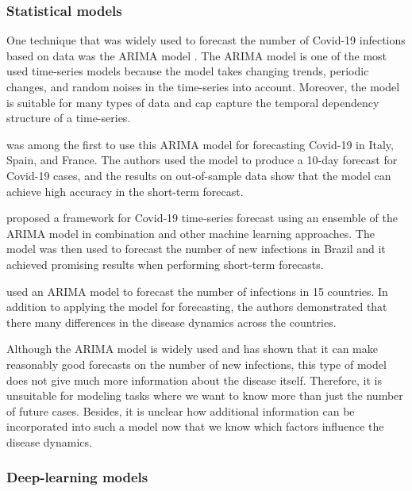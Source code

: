 \subsubsection{Statistical models}

One technique that was widely used to forecast the number of Covid-19 infections based on data was the \gls{ARIMA} model \cite{box2015time}.
The \gls{ARIMA} model is one of the most used time-series models because the model takes changing trends, periodic changes, and random noises in the time-series into account.
Moreover, the model is suitable for many types of data and cap capture the temporal dependency structure of a time-series.

\citeauthor{ceylanEstimationCOVID19Prevalence2020} \cite{ceylanEstimationCOVID19Prevalence2020} was among the first to use this \gls{ARIMA} model for forecasting Covid-19 in Italy, Spain, and France.
The authors used the model to produce a 10-day forecast for Covid-19 cases, and the results on out-of-sample data show that the model can achieve high accuracy in the short-term forecast.

\citeauthor{ribeiroShorttermForecastingCOVID192020} \cite{ribeiroShorttermForecastingCOVID192020} proposed a framework for Covid-19 time-series forecast using an ensemble of the \gls{ARIMA} model in combination and other machine learning approaches.
The model was then used to forecast the number of new infections in Brazil and it achieved promising results when performing short-term forecasts.

\citeauthor{singhPredictionCOVID19Pandemic2020} \cite{singhPredictionCOVID19Pandemic2020} used an \gls{ARIMA} model to forecast the number of infections in 15 countries.
In addition to applying the model for forecasting, the authors demonstrated that there many differences in the disease dynamics across the countries.

Although the \gls{ARIMA} model is widely used and has shown that it can make reasonably good forecasts on the number of new infections, this type of model does not give much more information about the disease itself.
Therefore, it is unsuitable for modeling tasks where we want to know more than just the number of future cases.
Besides, it is unclear how additional information can be incorporated into such a model now that we know which factors influence the disease dynamics.

\subsubsection{Deep-learning models}

